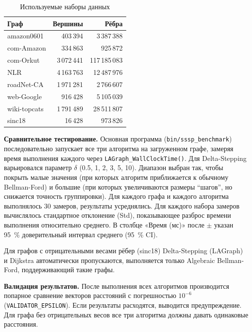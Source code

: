 \documentclass[a4paper]{article}
\begin{document}
\begin{table}[h!]
    \centering
    \caption{Используемые наборы данных}
    \label{tab:datasets}
    \begin{tabular}{lrr}
        \toprule
        \textbf{Граф} & \textbf{Вершины} & \textbf{Рёбра} \\
        \midrule
        amazon0601   & 403\,394  & 3\,387\,388  \\
        com-Amazon   & 334\,863  &   925\,872  \\
        com-Orkut    & 3\,072\,441 & 117\,185\,083 \\
        NLR          & 4\,163\,763 & 12\,487\,976 \\
        roadNet-CA   & 1\,971\,281 & 2\,766\,607  \\
        web-Google   & 916\,428  & 5\,105\,039  \\
        wiki-topcats & 1\,791\,489 & 28\,511\,807 \\
        sinc18       & 16\,428   & 973\,826     \\
        \bottomrule
    \end{tabular}
\end{table}

\textbf{Сравнительное тестирование.} Основная программа (\texttt{bin/sssp\_benchmark}) последовательно
запускает все три алгоритма на загруженном графе, замеряя время выполнения каждого
через \texttt{LAGraph\_WallClockTime()}. Для Delta-Stepping варьировался параметр $\delta$
(0.5, 1, 2, 3, 5, 10). Диапазон выбран так, чтобы покрыть малые значения
(при которых алгоритм приближается к обычному Bellman-Ford) и большие
(при которых увеличиваются размеры ``шагов'', но снижается точность группировки).
Для каждого графа и каждого алгоритма выполнялось 30 замеров, результаты
усреднялись. Для каждого набора замеров вычислялось стандартное отклонение
(Std), показывающее разброс времени выполнения относительно среднего.
В столбце «Время (мс)» после $\pm$ указан 95~\% доверительный интервал
среднего (95~\% CI).

Для графов с отрицательными весами рёбер (sinc18) Delta-Stepping (LAGraph) и Dijkstra
автоматически пропускаются, выполняется только Algebraic Bellman-Ford,
поддерживающий такие графы.

\textbf{Валидация результатов.} После выполнения всех алгоритмов производится
попарное сравнение векторов расстояний с погрешностью $10^{-6}$
(\texttt{VALIDATOR\_EPSILON}). Если результаты расходятся, выводится
предупреждение. Для графа без отрицательных весов все три алгоритма должны
давать одинаковые расстояния.
\end{document}
